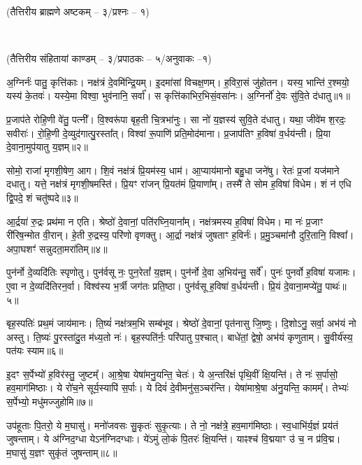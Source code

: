 
\vspace{-1ex}
\centerline{\normalsize(तैत्तिरीय ब्राह्मणे अष्टकम् -- ३/प्रश्नः -- १)}\mbox{}\\[-2em]
\centerline{\normalsize(तैत्तिरीय संहितायां काण्डम् -- ३/प्रपाठकः -- ५/अनुवाकः --१)}

अ॒ग्निर्नः॑ पातु॒ कृत्ति॑काः। नक्ष॑त्रं दे॒वमि॑न्द्रि॒यम्। इ॒दमा॑सां विचक्ष॒णम्। ह॒विरा॒सं जु॑होतन। यस्य॒ भान्ति॑ र॒श्मयो॒ यस्य॑ के॒तवः॑। यस्ये॒मा विश्वा॒ भुव॑नानि॒ सर्वा᳚। स कृत्ति॑काभि\-र॒भिसं॒वसा॑नः। अ॒ग्निर्नो॑ दे॒वः सु॑वि॒ते द॑धातु॥१॥ 

प्र॒जाप॑ते रोहि॒णी वे॑तु॒ पत्नी᳚। वि॒श्वरू॑पा बृह॒ती चि॒त्रभा॑नुः। सा नो॑ य॒ज्ञस्य॑ सुवि॒ते द॑धातु। यथा॒ जीवे॑म श॒रदः॒ सवीराः॑। रो॒हि॒णी दे॒व्युद॑गात्पु॒रस्ता᳚त्। विश्वा॑ रू॒पाणि॑ प्रति॒मोद॑माना। प्र॒जाप॑तिꣳ ह॒विषा॑ व॒र्धय॑न्ती। प्रि॒या दे॒वाना॒मुप॑यातु य॒ज्ञम्॥२॥ 

सोमो॒ राजा॑ मृगशी॒\ar{}षेण॒ आग\snn{}। शि॒वं नक्ष॑त्रं प्रि॒यम॑स्य॒ धाम॑। आ॒प्याय॑मानो बहु॒धा जने॑षु। रेतः॑ प्र॒जां यज॑माने दधातु। यत्ते॒ नक्ष॑त्रं मृगशी॒\ar{}षमस्ति॑। प्रि॒यꣳ रा॑जन् प्रि॒यत॑मं प्रि॒याणा᳚म्। तस्मै॑ ते सोम ह॒विषा॑ विधेम। शं न॑ एधि द्वि॒पदे॒ शं चतु॑ष्पदे॥३॥ 

आ॒र्द्रया॑ रु॒द्रः प्रथ॑मा न एति। श्रेष्ठो॑ दे॒वानां॒ पति॑रघ्नि॒याना᳚म्। नक्ष॑त्रमस्य ह॒विषा॑ विधेम। मा नः॑ प्र॒जाꣳ री॑रिष॒न्मोत वी॒रान्। हे॒ती रु॒द्रस्य॒ परि॑णो वृणक्तु। आ॒र्द्रा नक्ष॑त्रं जुषताꣳ ह॒विर्नः॑। प्र॒मु॒ञ्चमा॑नौ दुरि॒तानि॒ विश्वा᳚। अपा॒घशꣳ॑ सन्नुदता॒मरा॑तिम्॥४॥ 

पुन॑र्नो दे॒व्यदि॑तिः स्पृणोतु। पुन॑र्वसू नः॒ पुन॒रेतां᳚ य॒ज्ञम्। पुन॑र्नो दे॒वा अ॒भिय॑न्तु॒ सर्वे᳚। पुनः॑ पुनर्वो ह॒विषा॑ यजामः। ए॒वा न दे॒व्यदि॑तिरन॒र्वा। विश्व॑स्य भ॒र्त्री जग॑तः प्रति॒ष्ठा। पुन॑र्वसू ह॒विषा॑ व॒र्धय॑न्ती। प्रि॒यं दे॒वाना॒मप्ये॑तु॒ पाथः॑॥५॥ 

बृह॒स्पतिः॑ प्रथ॒मं जाय॑मानः। ति॒ष्यं॑ नक्ष॑त्रम॒भि सम्ब॑भूव। श्रेष्ठो॑ दे॒वानां॒ पृत॑नासु  जि॒ष्णुः। दि॒शोऽनु॒ सर्वा॒ अभ॑यं नो अस्तु। ति॒ष्यः॑ पु॒रस्ता॑दु॒त म॑ध्य॒तो नः॑। बृह॒स्पति॑र्नः॒ परि॑पातु प॒श्चात्। बाधे॑तां॒ द्वेषो॒ अभ॑यं कृणुताम्। सु॒वीर्य॑स्य॒ पत॑यः स्याम॥६॥ 

इ॒दꣳ स॒र्पेभ्यो॑ ह॒विर॑स्तु॒ जुष्टम्᳚। आ॒श्रे॒षा येषा॑मनु॒यन्ति॒ चेतः॑। ये अ॒न्तरि॑क्षं पृथि॒वीं क्षि॒यन्ति॑। ते नः॑ स॒र्पासो॒ हव॒माग॑मिष्ठाः। ये रो॑च॒ने सूर्य॒स्यापि॑ स॒र्पाः। ये दिवं॑ दे॒वीमनु॑स॒ञ्चर॑न्ति। येषा॑माश्रे॒षा अ॑नु॒यन्ति॒ कामम्᳚। तेभ्यः॑ स॒र्पेभ्यो॒ मधु॑मज्जुहोमि॥७॥ 

उप॑हूताः पि॒तरो॒ ये म॒घासु॑। मनो॑जवसः सु॒कृतः॑ सुकृ॒त्याः। ते नो॒ नक्ष॑त्रे॒ हव॒माग॑मिष्ठाः। स्व॒धाभि॑र्य॒ज्ञं प्रय॑तं जुषन्ताम्। ये अ॑ग्निद॒ग्धा येऽन॑ग्निदग्धाः। ये॑ऽमुं लो॒कं पि॒तरः॑ क्षि॒यन्ति॑। याꣴश्च॑ वि॒द्मयाꣳ उ॑ च॒ न प्र॑वि॒द्म। म॒घासु॑ य॒ज्ञꣳ सुकृ॑तं जुषन्ताम्॥८॥ 

